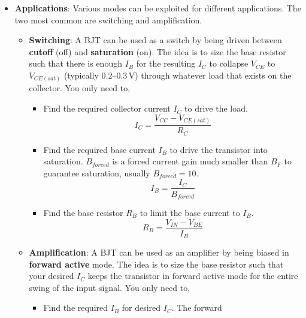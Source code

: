 \begin{itemize}
\begin{table}[H]
\begin{tabular}{|c|c|c|c|}
        Reverse Active             & $V_{BE} < 0.7       $ & $V_{BC} \gtrsim 0.7 $ & $-I_E \approx B_R I_B$ \\ \hline
      \end{tabular}
    \end{table}
    In practice the base-collector junction starts to conduct noticeably at
    \(V_{BC} \approx 0.4\text{--}0.5\,\)V, so forward active is safest for
    \(V_{CE} \gtrsim 0.3\,\)V (\(V_{BC} = V_{BE} - V_{CE}\)).
  \item \textbf{Applications}:
    Various modes can be exploited for different applications. The two
    most common are switching and amplification.
    \begin{itemize}
      \item \textbf{Switching}:
        A BJT can be used as a switch by being driven between \textbf{cutoff}
        (off) and \textbf{saturation} (on). The idea is to size the base resistor
        such that there is enough \(I_B\) for the resulting \(I_C\) to collapse \(V_{CE}\) to
        \(V_{CE(sat)}\) (typically \(0.2\text{--}0.3\,\mathrm{V}\)) through whatever load
        that exists on the collector. You only need to,
        \begin {itemize}
          \item Find the required collector current \(I_C\) to drive the load.
            \[
              I_C = \frac{V_{CC} - V_{CE(sat)}}{R_C}
            \]
          \item Find the required base current \(I_B\) to drive the transistor into
            saturation. \(B_{forced}\) is a forced current gain much smaller than \(B_F\)
            to guarantee saturation, usually \(B_{forced} = 10\).
            \[
              I_B = \frac{I_C}{B_{forced}}
            \]
          \item Find the base resistor \(R_B\) to limit the base current to \(I_B\).
            \[
              R_B = \frac{V_{IN} - V_{BE}}{I_B}
            \]
        \end{itemize}
      \item \textbf{Amplification}:
        A BJT can be used as an amplifier by being biased in \textbf{forward
        active} mode. The idea is to size the base resistor such that your
        desired \(I_C\) keeps the transistor in forward active mode for the
        entire swing of the input signal. You only need to,
        \begin{itemize}
          \item Find the required \(I_B\) for desired \(I_C\). The forward

\end{itemize}
\end{itemize}
\end{itemize}
